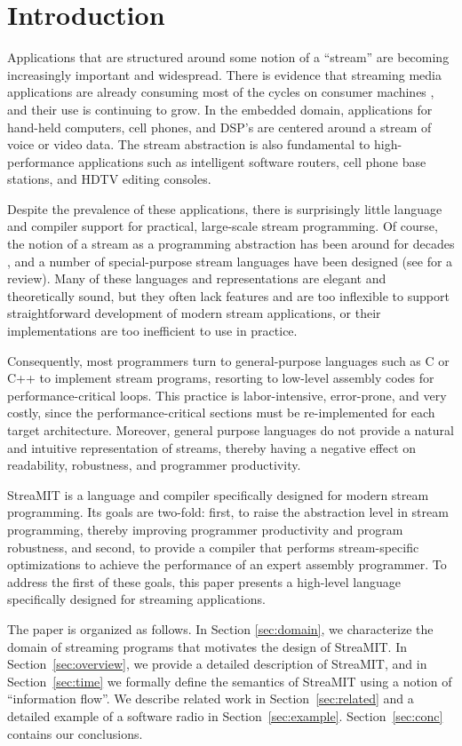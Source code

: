 \section{Introduction}

Applications that are structured around some notion of a ``stream''
are becoming increasingly important and widespread.  There is evidence
that streaming media applications are already consuming most of the
cycles on consumer machines \cite{Rix98}, and their use is continuing
to grow.  In the embedded domain, applications for hand-held
computers, cell phones, and DSP's are centered around a stream of
voice or video data.  The stream abstraction is also fundamental to
high-performance applications such as intelligent software routers,
cell phone base stations, and HDTV editing consoles.

Despite the prevalence of these applications, there is surprisingly
little language and compiler support for practical, large-scale stream
programming.  Of course, the notion of a stream as a programming
abstraction has been around for decades \cite{SICP}, and a number of
special-purpose stream languages have been designed (see
\cite{survey97} for a review).  Many of these languages and
representations are elegant and theoretically sound, but they often
lack features and are too inflexible to support straightforward
development of modern stream applications, or their implementations
are too inefficient to use in practice.

Consequently, most programmers turn to general-purpose languages such
as C or C++ to implement stream programs, resorting to low-level
assembly codes for performance-critical loops.  This practice is
labor-intensive, error-prone, and very costly, since the
performance-critical sections must be re-implemented for each target
architecture.  Moreover, general purpose languages do not provide a
natural and intuitive representation of streams, thereby having a
negative effect on readability, robustness, and programmer
productivity.

StreaMIT is a language and compiler specifically designed for modern
stream programming.  Its goals are two-fold: first, to raise the
abstraction level in stream programming, thereby improving programmer
productivity and program robustness, and second, to provide a compiler
that performs stream-specific optimizations to achieve the performance
of an expert assembly programmer.  To address the first of these
goals, this paper presents a high-level language specifically designed
for streaming applications.

The paper is organized as follows. In Section {\ref{sec:domain}}, we
characterize the domain of streaming programs that motivates the
design of StreaMIT.  In Section~\ref{sec:overview}, we provide a
detailed description of StreaMIT, and in Section~\ref{sec:time} we
formally define the semantics of StreaMIT using a notion of
``information flow''. We describe related work in
Section~\ref{sec:related} and a detailed example of a software radio
in Section~\ref{sec:example}.  Section~\ref{sec:conc} contains our
conclusions.


